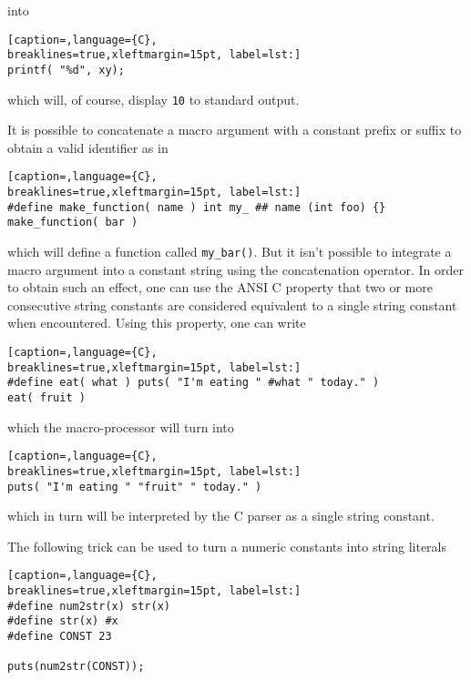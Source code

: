 into 
\lstset{basicstyle=\scriptsize, numbers=left, captionpos=b, tabsize=4}
\begin{lstlisting}[caption=,language={C},
breaklines=true,xleftmargin=15pt, label=lst:]
printf( "%d", xy);
\end{lstlisting}
		
which will, of course, display \texttt{10} to standard output.

It is possible to concatenate a macro argument with a constant prefix or suffix
to obtain a valid identifier as in
\lstset{basicstyle=\scriptsize, numbers=left, captionpos=b, tabsize=4}
\begin{lstlisting}[caption=,language={C},
breaklines=true,xleftmargin=15pt, label=lst:]
#define make_function( name ) int my_ ## name (int foo) {}
make_function( bar )
\end{lstlisting}

which will define a function called \texttt{my\_bar()}. But it isn't possible
to integrate a macro argument into a constant string using the concatenation
operator. In order to obtain such an effect, one can use the ANSI C property
that two or more consecutive string constants are considered equivalent to a
single string constant when encountered. Using this property, one can write
\lstset{basicstyle=\scriptsize, numbers=left, captionpos=b, tabsize=4}
\begin{lstlisting}[caption=,language={C},
breaklines=true,xleftmargin=15pt, label=lst:]
#define eat( what ) puts( "I'm eating " #what " today." )
eat( fruit )
\end{lstlisting}

which the macro-processor will turn into
\lstset{basicstyle=\scriptsize, numbers=left, captionpos=b, tabsize=4}
\begin{lstlisting}[caption=,language={C},
breaklines=true,xleftmargin=15pt, label=lst:]
puts( "I'm eating " "fruit" " today." )
\end{lstlisting}

which in turn will be interpreted by the C parser as a single string constant.

The following trick can be used to turn a numeric constants into string
literals
\lstset{basicstyle=\scriptsize, numbers=left, captionpos=b, tabsize=4}
\begin{lstlisting}[caption=,language={C},
breaklines=true,xleftmargin=15pt, label=lst:]
#define num2str(x) str(x)
#define str(x) #x
#define CONST 23

puts(num2str(CONST));
\end{lstlisting}

